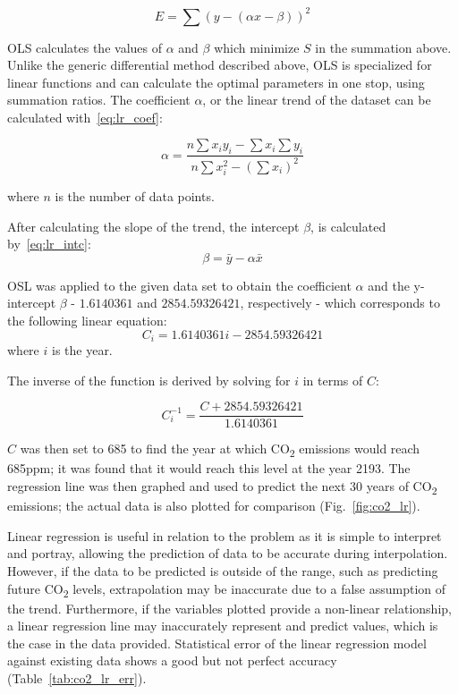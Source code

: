 \documentclass[12pt]{mcmthesis}
\begin{document}
    \begin{equation}
        E = \sum{(y - (\alpha x - \beta))^2}
        \label{eq:ls_lr}
    \end{equation}

    OLS calculates the values of $\alpha$ and $\beta$ which minimize $S$ in the summation above.
    Unlike the generic differential method described above, OLS is specialized for linear functions and can calculate the optimal parameters in one stop, using summation ratios.
    The coefficient $\alpha$, or the linear trend of the dataset can be calculated with~\eqref{eq:lr_coef}:

    \begin{equation}
        \alpha = \frac{n \sum x_i y_i - \sum x_i \sum y_i }{n \sum x^2_i - (\sum x_i)^2}
        \label{eq:lr_coef}
    \end{equation}

    \noindent where $n$ is the number of data points.

    After calculating the slope of the trend, the intercept $\beta$, is calculated by~\eqref{eq:lr_intc}:
%
    \begin{equation}
        \beta = \bar y - \alpha \bar x
        \label{eq:lr_intc}
    \end{equation}

    OSL was applied to the given data set to obtain the coefficient $\alpha$ and the y-intercept $\beta$ - $1.6140361$ and $2854.59326421$, respectively - which corresponds to the following linear equation:
%
    \begin{equation}
        C_i = 1.6140361 i - 2854.59326421
        \label{eq:co2_lr}
    \end{equation}
%
    \noindent where $i$ is the year.

    The inverse of the function is derived by solving for $i$ in terms of $C$:

    \begin{equation}
        C^{-1}_i = \frac{C + 2854.59326421}{1.6140361}
        \label{eq:co2_lr_inv}
    \end{equation}

    $C$ was then set to 685 to find the year at which CO\textsubscript{2} emissions would reach 685ppm; it was found that it would reach this level at the year 2193.
    The regression line was then graphed and used to predict the next 30 years of CO\textsubscript{2} emissions; the actual data is also plotted for comparison (Fig.~\ref{fig:co2_lr}).


    Linear regression is useful in relation to the problem as it is simple to interpret and portray, allowing the prediction of data to be accurate during interpolation.
    However, if the data to be predicted is outside of the range, such as predicting future CO\textsubscript{2} levels, extrapolation may be inaccurate due to a false assumption of the trend.
    Furthermore, if the variables plotted provide a non-linear relationship, a linear regression line may inaccurately represent and predict values, which is the case in the data provided.
    Statistical error of the linear regression model against existing data shows a good but not perfect accuracy (Table~\ref{tab:co2_lr_err}).
\end{document}

